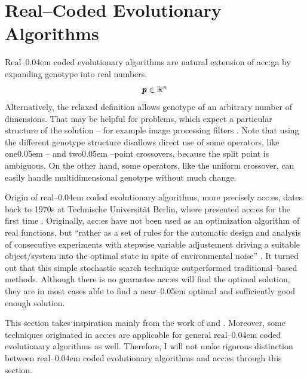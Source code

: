 \section{Real--Coded Evolutionary Algorithms}
\label{chap:realcodedea}

Real--\kern0.04em coded evolutionary algorithms are natural extension of \acrshort{acc:ga} by expanding genotype into real numbers.
$$
\pmb{p} \in \mathbb{R}^{n}
$$
Alternatively, the relaxed definition allows genotype of an arbitrary number of dimensions. That may be helpful for problems, which expect a particular structure of the solution -- for example image processing filters \citep{WVDF}. Note that using the different genotype structure disallows direct use of some operators, like one\kern0.05em -- and two\kern0.05em --point crossovers, because the split point is ambiguous. On the other hand, some operators, like the uniform crossover, can easily handle multidimensional genotype without much change.

Origin of real--\kern0.04em coded evolutionary algorithms, more precisely \acrfull{acc:es}, dates back to 1970s at Technische Universität Berlin, where \citeauthor*{ES-original} presented \acrshort{acc:es} for the first time \citep{ES-original}. Originally, \acrshort{acc:es} have not been used as an optimization algorithm of real functions, but \enquote{rather as a set of rules for the automatic design and analysis of consecutive experiments with stepwise variable adjustement driving a suitable object/system into the optimal state in spite of environmental noise} \citep{EScomprehensiveintroduction}. It turned out that this simple stochastic search technique outperformed traditional--based methods. Although there is no guarantee \acrshort{acc:es} will find the optimal solution, they are in most cases able to find a near--\kern0.05em optimal and sufficiently good enough solution.

This section takes inspiration mainly from the work of \citet*{IntroductionToEA} and \citet*{EScomprehensiveintroduction}. Moreover, some techniques originated in \acrshort{acc:es} are applicable for general real--\kern0.04em coded evolutionary algorithms as well. Therefore, I will not make rigorous distinction between real--\kern0.04em coded evolutionary algorithms and \acrshort{acc:es} through this section.

